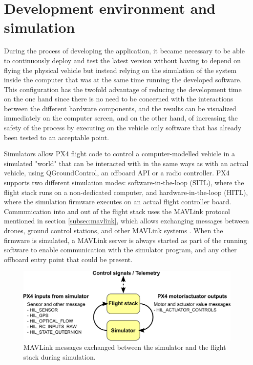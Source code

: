 \section{Development environment and simulation}
\label{sec:devenv}
During the process of developing the application, it became necessary to be able to continuously deploy and test the latest version without having to depend on flying the physical vehicle but instead relying on the simulation of the system inside the computer that was at the same time running the developed software.
This configuration has the twofold advantage of reducing the development time on the one hand since there is no need to be concerned with the interactions between the different hardware components, and the results can be visualized immediately on the computer screen, and on the other hand, of increasing the safety of the process by executing on the vehicle only software that has already been tested to an acceptable point.

Simulators allow PX4 flight code to control a computer-modelled vehicle in a simulated "world" that can be interacted with in the same ways as with an actual vehicle, using QGroundControl, an offboard API or a radio controller.
PX4 supports two different simulation modes: software-in-the-loop (SITL), where the flight stack runs on a non-dedicated computer, and hardware-in-the-loop (HITL), where the simulation firmware executes on an actual flight controller board.
Communication into and out of the flight stack uses the MAVLink protocol mentioned in section \ref{subsec:mavlink},
which allows exchanging messages between drones, ground control stations, and other MAVLink systems \cite{mavlink}.
When the firmware is simulated, a MAVLink server is always started as part of the running software to enable communication with the simulator program, and any other offboard entry point that could be present.


\begin{figure}
  \centering
  \includegraphics[width=\textwidth,keepaspectratio]{img/px4_simulator_messages.png}
  \caption{MAVLink messages exchanged between the simulator and the flight stack during simulation.}
  \label{fig:simulator-msgs}
\end{figure}

